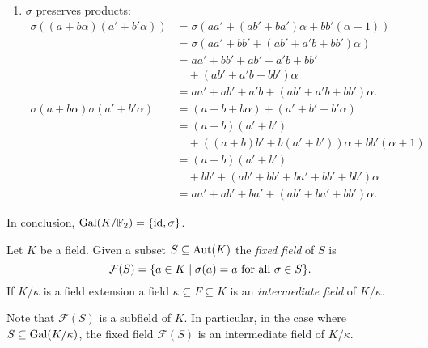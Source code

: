 \begin{xmpls}
\begin{enumerate}[a), font=\upshape]
\begin{enumerate}[-]
            \item $\sigma$ preserves products:
            \begin{align*}
                \sigma((a+b\alpha)(a'+b'\alpha))
                    &= \sigma(aa'+(ab'+ba')\alpha + bb'(\alpha+1))\\
                    &= \sigma(aa'+bb'+(ab'+a'b + bb')\alpha)\\
                    &= aa'+bb'+ab'+a'b+bb'\\
                    &\quad+ (ab'+a'b+bb')\alpha\\
                    &= aa'+ab'+a'b+(ab'+a'b+bb')\alpha.\\
                \sigma(a+b\alpha)\sigma(a'+b'\alpha)
                    &= (a+b+b\alpha)+(a'+b'+b'\alpha)\\
                    &= (a+b)(a'+b')\\
                    &\quad+ ((a+b)b'+b(a'+b'))\alpha+bb'(\alpha+1)\\
                    &= (a+b)(a'+b')\\
                    &\quad+ bb'+(ab'+bb'+ba'+bb'+bb')\alpha\\
                    &= aa'+ab'+ba'+(ab'+ba'+bb')\alpha.
            \end{align*}
        \end{enumerate}
        In conclusion, $\operatorname{Gal}(K/\mathbb F_2)=\{\operatorname{id},\sigma\}$.
    \end{enumerate}
\end{xmpls}

\begin{defns}
    Let $K$ be a field. Given a subset $S\subseteq{\rm Aut}(K)$ the \textsl{fixed field\/} of $S$ is
    $$
        \mathcal F(S) = \{a\in K\mid \sigma(a)=a\text{ for all } \sigma\in S\}.
    $$
    If $K/\kappa$ is a field extension a field $\kappa\subseteq F\subseteq K$ is an \textsl{intermediate field} of $K/\kappa$.
\end{defns}

\begin{rem}
    Note that $\mathcal F(S)$ is a subfield of $K$. In particular, in the case where $S\subseteq\operatorname{Gal}(K/\kappa)$, the fixed field $\mathcal F(S)$ is an intermediate field of $K/\kappa$.
\end{rem}

